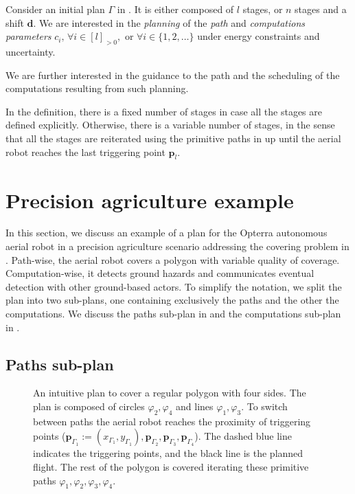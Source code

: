 \begin{highlight}
\begin{pb}\label{pb}
  Consider an initial plan $\Gamma$ in . It is either composed of $l$ stages, or $n$ stages and a shift $\mathbf{d}$. We are interested in the \emph{planning} of the \emph{path} and \emph{computations parameters} $c_i,\,\forall i\in[l]_{>0},$ or $\forall i\in\{1,2,\dots\}$ under energy constraints and uncertainty.
  
  We are further interested in the guidance to the path and the scheduling of the computations resulting from such planning.
\end{pb}    
\end{highlight}

In the definition, there is a fixed number of stages in case all the stages are defined explicitly. Otherwise, there is a variable number of stages, in the sense that all the stages are reiterated using the primitive paths in  up until the aerial robot reaches the last triggering point $\mathbf{p}_l$.


\section{Precision agriculture example}
\label{sec:flight-plan}

In this section, we discuss an example of a plan for the Opterra autonomous aerial robot in a precision agriculture scenario addressing the covering problem in . Path-wise, the aerial robot covers a polygon with variable quality of coverage. Computation-wise, it detects ground hazards and communicates eventual detection with other ground-based actors. To simplify the notation, we split the plan into two sub-plans, one containing exclusively the paths and the other the computations. We discuss the paths sub-plan in  and the computations sub-plan in .

\subsection{Paths sub-plan}
\label{sec:path-wise}

\begin{figure}[h]
  \centering
  
  \caption[Intuitive plan to cover a regular polygon with four sides]{An intuitive plan to cover a regular polygon with four sides. The plan is composed of circles $\varphi_2,\varphi_4$ and lines $\varphi_1,\varphi_3$. To switch between paths the aerial robot reaches the proximity of triggering points ($\mathbf{p}_{\Gamma_1}:=(x_{\Gamma_1},y_{\Gamma_1}),\mathbf{p}_{\Gamma_2},\mathbf{p}_{\Gamma_3},\mathbf{p}_{\Gamma_4}$). The dashed blue line indicates the triggering points, and the black line is the planned flight. The rest of the polygon is covered iterating these primitive paths $\varphi_1,\varphi_2,\varphi_3,\varphi_4$.}
  \label{fig:plot3}
\end{figure}


